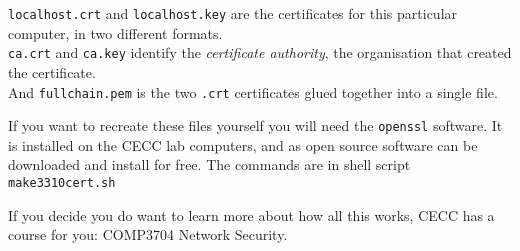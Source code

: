 \texttt{localhost.crt} and \texttt{localhost.key} are the certificates for this particular
computer, in two different formats. \\
\texttt{ca.crt} and \texttt{ca.key} identify the \emph{certificate authority}, the
organisation that created the certificate. \\
And \texttt{fullchain.pem} is the two \texttt{.crt} certificates glued together into a
single file.

If you want to recreate these files yourself you will need the \texttt{openssl} software.
It is installed on the CECC lab computers, and as open source software can be downloaded
and install for free.
The commands are in shell script \texttt{make3310cert.sh}

If you decide you do want to learn more about how all this works, CECC
has a course for you: COMP3704 Network Security.

\COPYRIGHT


